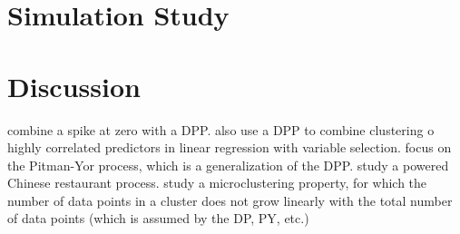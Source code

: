 \documentclass[11pt,a4paper]{article}
\theoremstyle{definition} %
\theoremstyle{case}
\begin{document}
\section{Simulation Study}

\section{Discussion}
\textcite{kim2009spiked} combine a spike at zero with a DPP. \textcite{curtis2011bayesian} also use a DPP to combine clustering o highly correlated predictors in linear regression with variable selection. \textcite{canale2017pitman} focus on the Pitman-Yor process, which is a generalization of the DPP. \textcite{lu2018reducing} study a powered Chinese restaurant process. \textcite{miller2015microclustering} study a microclustering property, for which the number of data points in a cluster does not grow linearly with the total number of data points (which is assumed by the DP, PY, etc.)


\printbibliography
\end{document}
